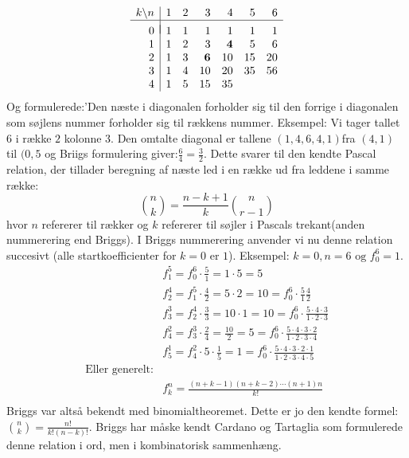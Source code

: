 \begin{equation*}
\begin{array}{r|rrrrrrr} 
k\backslash n&1&2&3&4&5&6\\ \hline 
\\[-8pt]
0&1&1&1&1&1&1\\
1&1&2&3&\mathbf{4}&5&6\\
2&1&3&\mathbf{6}&10&15&20\\
3&1&4&10&20&35&56\\
4&1&5&15&35\\
\end{array}
\end{equation*}
Og formulerede:'Den næste i diagonalen forholder sig til den forrige i diagonalen som søjlens nummer forholder sig til rækkens nummer. Eksempel: Vi tager tallet \(6\) i række \(2\) kolonne \(3\). Den omtalte diagonal er tallene \((1,4,6,4,1)\)fra \((4,1)\) til \((0,5\) og Briigs formulering giver:\(\frac{6}{4}=\frac{3}{2}\). Dette svarer til den kendte Pascal relation, der tillader beregning af næste led i en række ud fra leddene i samme række:
\begin{equation}
\binom{n}{k}=\frac{n-k+1}{k}\binom{n}{r-1}
\end{equation}
hvor \(n\) refererer til rækker og \(k\) refererer til søjler i Pascals trekant(anden nummerering end Briggs). I Briggs nummerering anvender vi nu denne relation succesivt (alle startkoefficienter for \(k=0\) er \(1\)). Eksempel: \(k=0, n=6 \text{ og } f_{0}^{6}=1\).
\begin{align*}
&f_{1}^{5}=f_{0}^{6}\cdot \frac{5}{1}=1 \cdot 5 =5\\
&f_{2}^{4}=f_{1}^{5}\cdot \frac{4}{2}=5 \cdot 2 =10=f_{0}^{6} \cdot \frac{5}{1}\frac{4}{2} \\
&f_{3}^{3}=f_{2}^{4}\cdot \frac{3}{3}=10 \cdot 1 =10=f_{0}^{6} \cdot \frac{5 \cdot 4 \cdot 3}{1 \cdot 2 \cdot 3}\\
&f_{4}^{2}=f_{3}^{3}\cdot \frac{2}{4}=\frac{10}{2} =5=f_{0}^{6} \cdot \frac{5 \cdot 4 \cdot 3 \cdot 2}{1 \cdot 2 \cdot 3 \cdot 4}\\
&f_{5}^{1}=f_{4}^{2}\cdot 5 \cdot \frac{1}{5}=1=f_{0}^{6} \cdot \frac{5 \cdot 4 \cdot 3 \cdot 2 \cdot 1}{1 \cdot 2 \cdot 3 \cdot 4 \cdot 5}\\
\text{Eller generelt:}\\
&f_{k}^{n}=\frac{(n+k-1)(n+k-2) \dotsm (n+1)n}{k!}\\
\end{align*}
Briggs var altså bekendt med binomialtheoremet. Dette er jo den kendte formel: \(\binom{n}{k}=\frac{n!}{k!(n-k)!}\). Briggs har måske kendt Cardano og Tartaglia som formulerede denne relation i ord, men i kombinatorisk sammenhæng.
